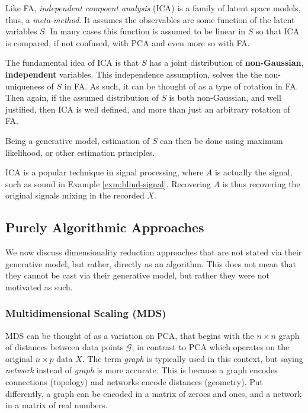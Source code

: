 \documentclass[]{book}
\theoremstyle{definition}
\theoremstyle{definition}
\theoremstyle{definition}
\theoremstyle{remark}
\begin{document}
Like FA, \emph{independent compoent analysis} (ICA) is a family of latent space models, thus, a \emph{meta-method}.
It assumes the observables are some function of the latent variables \(S\).
In many cases this function is assumed to be linear in \(S\) so that ICA is compared, if not confused, with PCA and even more so with FA.

The fundamental idea of ICA is that \(S\) has a joint distribution of \textbf{non-Gaussian}, \textbf{independent} variables.
This independence assumption, solves the the non-uniqueness of \(S\) in FA.
As such, it can be thought of as a type of rotation in FA.
Then again, if the assumed distribution of \(S\) is both non-Gaussian, and well justified, then ICA is well defined, and more than just an arbitrary rotation of FA.

Being a generative model, estimation of \(S\) can then be done using maximum likelihood, or other estimation principles.

ICA is a popular technique in signal processing, where \(A\) is actually the signal, such as sound in Example \ref{exm:blind-signal}.
Recovering \(A\) is thus recovering the original signals mixing in the recorded \(X\).

\hypertarget{purely-algorithmic-approaches}{%
\subsection{Purely Algorithmic Approaches}\label{purely-algorithmic-approaches}}

We now discuss dimensionality reduction approaches that are not stated via their generative model, but rather, directly as an algorithm.
This does not mean that they cannot be cast via their generative model, but rather they were not motivated as such.

\hypertarget{multidimensional-scaling-mds}{%
\subsubsection{Multidimensional Scaling (MDS)}\label{multidimensional-scaling-mds}}

MDS can be thought of as a variation on PCA, that begins with the \(n \times n\) graph of distances between data points \(\mathcal{G}\); in contrast to PCA which operates on the original \(n \times p\) data \(X\).
The term \emph{graph} is typically used in this context, but saying \emph{network} instead of \emph{graph} is more accurate. This is because a graph encodes connections (topology) and networks encode distances (geometry). Put differently, a graph can be encoded in a matrix of zeroes and ones, and a network in a matrix of real numbers.
\end{document}
